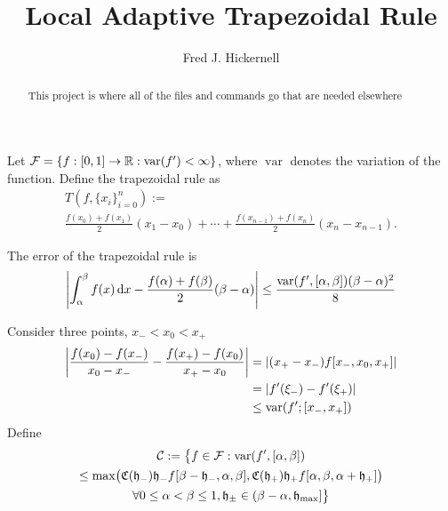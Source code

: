 \documentclass{amsart}
\DeclareMathOperator{\Var}{var}
\begin{document}
\title{Local Adaptive Trapezoidal Rule}
\author{Fred J. Hickernell}
\begin{abstract}This project is where all of the files and commands go that are needed elsewhere
\end{abstract}

\maketitle

Let $\cf = \{ f:[0,1] \to \reals : \Var(f') < \infty\}$, where $\Var$ denotes the variation of the function.  Define the trapezoidal rule as
\begin{multline}
    T(f,\{x_i\}_{i=0}^n) := \\
    \frac{f(x_0)+f(x_1)}{2}(x_1-x_0) + \cdots + \frac{ f(x_{n-1}) +f(x_n)}{2}(x_n - x_{n-1}).
\end{multline}

The error of the trapezoidal rule is
\begin{equation}
    \left \lvert \int_{\alpha}^{\beta} f(x) \, \dif x - \frac{f(\alpha)+f(\beta)}{2}(\beta - \alpha) \right \rvert \le \frac{\Var(f',[\alpha,\beta])(\beta - \alpha)^2}{8}
\end{equation}

Consider three points, $x_- < x_0 < x_+$
\begin{align*}
    \abs{ \frac{f(x_0) - f(x_-)}{x_0 - x_-} - \frac{f(x_+) - f(x_0)}{x_+ - x_0}} &= 
    \abs{(x_+-x_-)f[x_-,x_0,x_+]} \\
    & = \abs{f'(\xi_-) - f'(\xi_+)} \\
    & \le \Var(f';[x_-,x_+])
\end{align*}
Define 
\begin{multline}
    \cc : =  \bigl\{ f \in \cf : \Var(f',[\alpha,\beta]) \\
    \le \max\bigl( \fC(\fh_-)\fh_- f[\beta- \fh_-, \alpha, \beta],\fC(\fh_+)\fh_+ f[\alpha, \beta, \alpha + \fh_+]\bigr)  \\
    \forall 0 \le \alpha < \beta \le 1, \fh_{\pm} \in  (\beta - \alpha, \fh_{\max}] \bigr\}
\end{multline}



\end{document}
